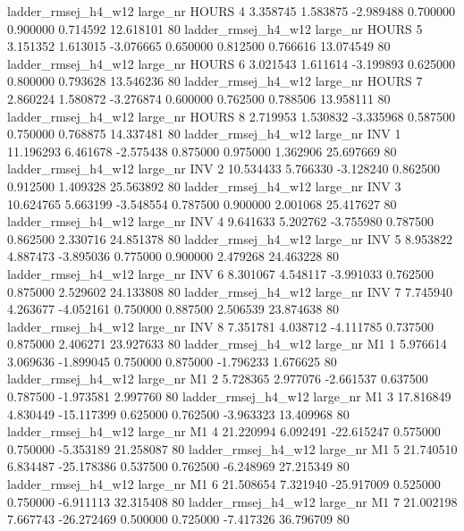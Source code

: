 ladder_rmsej_h4_w12   large_nr    HOURS                 4  3.358745  1.583875  -2.989488 0.700000 0.900000  0.714592   12.618101 80
ladder_rmsej_h4_w12   large_nr    HOURS                 5  3.151352  1.613015  -3.076665 0.650000 0.812500  0.766616   13.074549 80
ladder_rmsej_h4_w12   large_nr    HOURS                 6  3.021543  1.611614  -3.199893 0.625000 0.800000  0.793628   13.546236 80
ladder_rmsej_h4_w12   large_nr    HOURS                 7  2.860224  1.580872  -3.276874 0.600000 0.762500  0.788506   13.958111 80
ladder_rmsej_h4_w12   large_nr    HOURS                 8  2.719953  1.530832  -3.335968 0.587500 0.750000  0.768875   14.337481 80
ladder_rmsej_h4_w12   large_nr      INV                 1 11.196293  6.461678  -2.575438 0.875000 0.975000  1.362906   25.697669 80
ladder_rmsej_h4_w12   large_nr      INV                 2 10.534433  5.766330  -3.128240 0.862500 0.912500  1.409328   25.563892 80
ladder_rmsej_h4_w12   large_nr      INV                 3 10.624765  5.663199  -3.548554 0.787500 0.900000  2.001068   25.417627 80
ladder_rmsej_h4_w12   large_nr      INV                 4  9.641633  5.202762  -3.755980 0.787500 0.862500  2.330716   24.851378 80
ladder_rmsej_h4_w12   large_nr      INV                 5  8.953822  4.887473  -3.895036 0.775000 0.900000  2.479268   24.463228 80
ladder_rmsej_h4_w12   large_nr      INV                 6  8.301067  4.548117  -3.991033 0.762500 0.875000  2.529602   24.133808 80
ladder_rmsej_h4_w12   large_nr      INV                 7  7.745940  4.263677  -4.052161 0.750000 0.887500  2.506539   23.874638 80
ladder_rmsej_h4_w12   large_nr      INV                 8  7.351781  4.038712  -4.111785 0.737500 0.875000  2.406271   23.927633 80
ladder_rmsej_h4_w12   large_nr       M1                 1  5.976614  3.069636  -1.899045 0.750000 0.875000 -1.796233    1.676625 80
ladder_rmsej_h4_w12   large_nr       M1                 2  5.728365  2.977076  -2.661537 0.637500 0.787500 -1.973581    2.997760 80
ladder_rmsej_h4_w12   large_nr       M1                 3 17.816849  4.830449 -15.117399 0.625000 0.762500 -3.963323   13.409968 80
ladder_rmsej_h4_w12   large_nr       M1                 4 21.220994  6.092491 -22.615247 0.575000 0.750000 -5.353189   21.258087 80
ladder_rmsej_h4_w12   large_nr       M1                 5 21.740510  6.834487 -25.178386 0.537500 0.762500 -6.248969   27.215349 80
ladder_rmsej_h4_w12   large_nr       M1                 6 21.508654  7.321940 -25.917009 0.525000 0.750000 -6.911113   32.315408 80
ladder_rmsej_h4_w12   large_nr       M1                 7 21.002198  7.667743 -26.272469 0.500000 0.725000 -7.417326   36.796709 80
